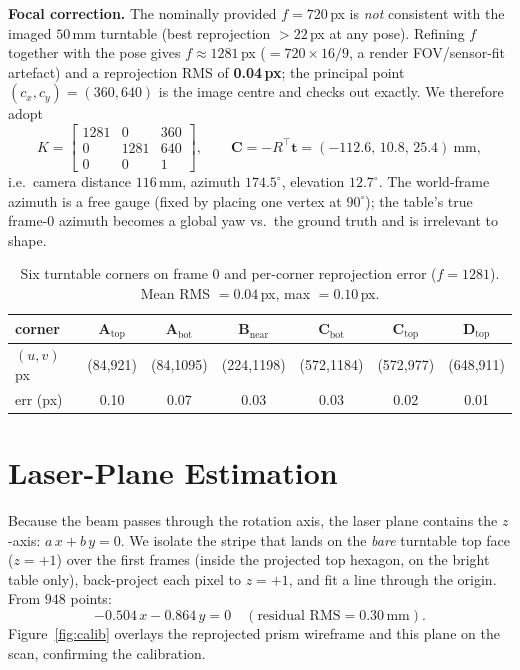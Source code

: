 \documentclass[11pt,a4paper]{article}
\begin{document}
\textbf{Focal correction.} The nominally provided $f=720$\,px is \emph{not}
consistent with the imaged $50$\,mm turntable (best reprojection $>22$\,px at any
pose). Refining $f$ together with the pose gives $f\!\approx\!1281$\,px
($=720\times16/9$, a render FOV/sensor-fit artefact) and a reprojection RMS of
\textbf{0.04\,px}; the principal point $(c_x,c_y)=(360,640)$ is the image centre
and checks out exactly. We therefore adopt
\[
  K=\begin{bmatrix}1281 & 0 & 360\\ 0 & 1281 & 640\\ 0&0&1\end{bmatrix},\qquad
  \mathbf{C}=-R^\top\mathbf t=(-112.6,\,10.8,\,25.4)\ \text{mm},
\]
i.e.\ camera distance $116$\,mm, azimuth $174.5^\circ$, elevation $12.7^\circ$.
The world-frame azimuth is a free gauge (fixed by placing one vertex at
$90^\circ$); the table's true frame-0 azimuth becomes a global yaw vs.\ the
ground truth and is irrelevant to shape.

\begin{table}[h]
\centering\footnotesize
\caption{Six turntable corners on frame 0 and per-corner reprojection error
($f{=}1281$). Mean RMS $=0.04$\,px, max $=0.10$\,px.}
\label{tab:corners}
\setlength{\tabcolsep}{4pt}
\begin{tabular}{lcccccc}
\toprule
corner & A$_{\text{top}}$ & A$_{\text{bot}}$ & B$_{\text{near}}$ & C$_{\text{bot}}$ & C$_{\text{top}}$ & D$_{\text{top}}$\\
\midrule
$(u,v)$ px & (84,921) & (84,1095) & (224,1198) & (572,1184) & (572,977) & (648,911)\\
err (px)   & 0.10 & 0.07 & 0.03 & 0.03 & 0.02 & 0.01\\
\bottomrule
\end{tabular}
\end{table}

\section{Laser-Plane Estimation}
Because the beam passes through the rotation axis, the laser plane contains the
$z$-axis: $a\,x+b\,y=0$. We isolate the stripe that lands on the \emph{bare}
turntable top face ($z=+1$) over the first frames (inside the projected top
hexagon, on the bright table only), back-project each pixel to $z=+1$, and fit a
line through the origin. From $948$ points:
\[
  -0.504\,x-0.864\,y=0\quad(\text{residual RMS}=0.30\,\text{mm}).
\]
Figure~\ref{fig:calib} overlays the reprojected prism wireframe and this plane
on the scan, confirming the calibration.
\end{document}

